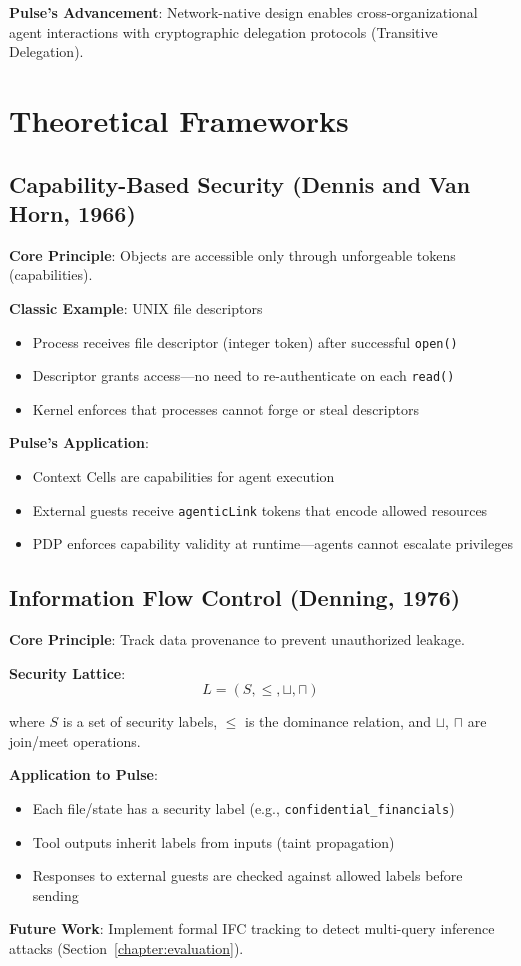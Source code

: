 \textbf{Pulse's Advancement}: Network-native design enables cross-organizational agent interactions with cryptographic delegation protocols (Transitive Delegation).

\section{Theoretical Frameworks}

\subsection{Capability-Based Security (Dennis and Van Horn, 1966)}

\textbf{Core Principle}: Objects are accessible only through unforgeable tokens (capabilities).

\textbf{Classic Example}: UNIX file descriptors
\begin{itemize}
    \item Process receives file descriptor (integer token) after successful \texttt{open()}
    \item Descriptor grants access—no need to re-authenticate on each \texttt{read()}
    \item Kernel enforces that processes cannot forge or steal descriptors
\end{itemize}

\textbf{Pulse's Application}:
\begin{itemize}
    \item Context Cells are capabilities for agent execution
    \item External guests receive \texttt{agenticLink} tokens that encode allowed resources
    \item PDP enforces capability validity at runtime—agents cannot escalate privileges
\end{itemize}

\subsection{Information Flow Control (Denning, 1976)}

\textbf{Core Principle}: Track data provenance to prevent unauthorized leakage.

\textbf{Security Lattice}:
\[
L = (S, \leq, \sqcup, \sqcap)
\]

where $S$ is a set of security labels, $\leq$ is the dominance relation, and $\sqcup$, $\sqcap$ are join/meet operations.

\textbf{Application to Pulse}:
\begin{itemize}
    \item Each file/state has a security label (e.g., \texttt{confidential\_financials})
    \item Tool outputs inherit labels from inputs (taint propagation)
    \item Responses to external guests are checked against allowed labels before sending
\end{itemize}

\textbf{Future Work}: Implement formal IFC tracking to detect multi-query inference attacks (Section~\ref{chapter:evaluation}).
